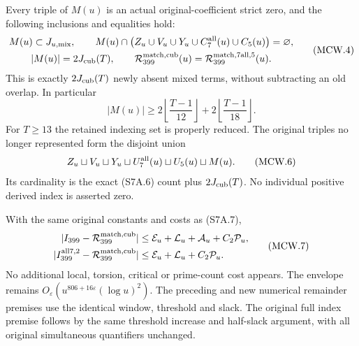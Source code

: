 \begin{theorem}
\label{AC-G204-window}
Every triple of $M(u)$ is an actual original-coefficient strict
zero, and the following inclusions and equalities hold:
\[
 \begin{gathered}
 M(u)\subset J_{u,\rm mix},\qquad
 M(u)\cap\bigl(Z_u\cup V_u\cup Y_u\cup C_7^{\rm all}(u)\cup C_5(u)\bigr)
                      =\varnothing,\\
 |M(u)|=2J_{\rm cub}(T),\qquad
 \mathcal R_{399}^{\rm match,cub}(u)
                        =\mathcal R_{399}^{\rm match,7all,5}(u).
 \end{gathered}\tag{MCW.4}
\]
This is exactly $2J_{\rm cub}(T)$ newly absent mixed terms,
without subtracting an old overlap. In particular
\[
 |M(u)|\geq
  2\left\lfloor\frac{T-1}{12}\right\rfloor+
  2\left\lfloor\frac{T-1}{18}\right\rfloor.
 \tag{MCW.5}
\]
For $T\geq13$ the retained indexing set is properly reduced.
The original triples no longer represented form the disjoint union
\[
 Z_u\sqcup V_u\sqcup Y_u\sqcup U_7^{\rm all}(u)\sqcup U_5(u)\sqcup M(u).
 \tag{MCW.6}
\]
Its cardinality is the exact (S7A.6) count plus $2J_{\rm cub}(T)$.
No individual positive derived index is asserted zero.

With the same original constants and costs as (S7A.7),
\[
 \begin{aligned}
 |I_{399}-\mathcal R_{399}^{\rm match,cub}|&\leq
        \mathcal E_u+\mathcal L_u+\mathcal A_u+C_2\mathcal P_u,\\
 |I_{399}^{\rm all7,2}-\mathcal R_{399}^{\rm match,cub}|&\leq
        \mathcal E_u+\mathcal L_u+C_2\mathcal P_u.
 \end{aligned}\tag{MCW.7}
\]
No additional local, torsion, critical or prime-count cost appears.
The envelope remains $O_\varepsilon(u^{806+16\varepsilon}(\log u)^2)$.
The preceding and new numerical remainder premises use the
identical window, threshold and slack. The original full index
premise follows by the same threshold increase and half-slack
argument, with all original simultaneous quantifiers unchanged.
\end{theorem}

